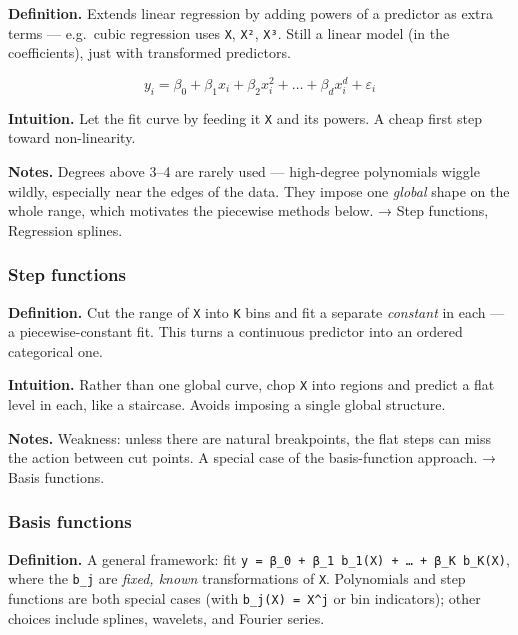 \documentclass[
  10pt,
  letterpaper,
  onecolumn]{article}
\begin{document}
\textbf{Definition.} Extends linear regression by adding powers of a
predictor as extra terms --- e.g.~cubic regression uses \texttt{X},
\texttt{X²}, \texttt{X³}. Still a linear model (in the coefficients),
just with transformed predictors.

\begin{equation*}
y_i=\beta_0+\beta_1x_i+\beta_2x_i^2+\dots+\beta_dx_i^d+\varepsilon_i
\end{equation*}

\textbf{Intuition.} Let the fit curve by feeding it \texttt{X} and its
powers. A cheap first step toward non-linearity.

\textbf{Notes.} Degrees above 3--4 are rarely used --- high-degree
polynomials wiggle wildly, especially near the edges of the data. They
impose one \emph{global} shape on the whole range, which motivates the
piecewise methods below. → Step functions, Regression splines.

\hypertarget{step-functions}{%
\subsubsection{Step functions}\label{step-functions}}

\textbf{Definition.} Cut the range of \texttt{X} into \texttt{K} bins
and fit a separate \emph{constant} in each --- a piecewise-constant fit.
This turns a continuous predictor into an ordered categorical one.

\textbf{Intuition.} Rather than one global curve, chop \texttt{X} into
regions and predict a flat level in each, like a staircase. Avoids
imposing a single global structure.

\textbf{Notes.} Weakness: unless there are natural breakpoints, the flat
steps can miss the action between cut points. A special case of the
basis-function approach. → Basis functions.

\hypertarget{basis-functions}{%
\subsubsection{Basis functions}\label{basis-functions}}

\textbf{Definition.} A general framework: fit
\texttt{y\ =\ β\_0\ +\ β\_1\ b\_1(X)\ +\ …\ +\ β\_K\ b\_K(X)}, where the
\texttt{b\_j} are \emph{fixed, known} transformations of \texttt{X}.
Polynomials and step functions are both special cases (with
\texttt{b\_j(X)\ =\ X\^{}j} or bin indicators); other choices include
splines, wavelets, and Fourier series.
\end{document}
